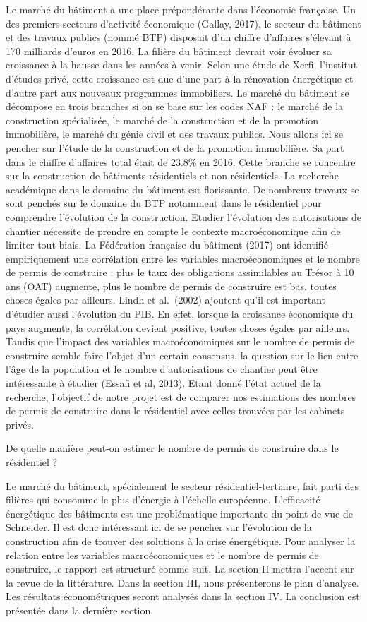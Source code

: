 \documentclass[11pt,]{article}
\begin{document}
Le marché du bâtiment a une place prépondérante dans l'économie
française. Un des premiers secteurs d'activité économique (Gallay,
2017), le secteur du bâtiment et des travaux publics (nommé BTP)
disposait d'un chiffre d'affaires s'élevant à 170 milliards d'euros en
2016. La filière du bâtiment devrait voir évoluer sa croissance à la
hausse dans les années à venir. Selon une étude de Xerfi, l'institut
d'études privé, cette croissance est due d'une part à la rénovation
énergétique et d'autre part aux nouveaux programmes immobiliers. Le
marché du bâtiment se décompose en trois branches si on se base sur les
codes NAF : le marché de la construction spécialisée, le marché de la
construction et de la promotion immobilière, le marché du génie civil et
des travaux publics. Nous allons ici se pencher sur l'étude de la
construction et de la promotion immobilière. Sa part dans le chiffre
d'affaires total était de 23.8\% en 2016. Cette branche se concentre sur
la construction de bâtiments résidentiels et non résidentiels. La
recherche académique dans le domaine du bâtiment est florissante. De
nombreux travaux se sont penchés sur le domaine du BTP notamment dans le
résidentiel pour comprendre l'évolution de la construction. Etudier
l'évolution des autorisations de chantier nécessite de prendre en compte
le contexte macroéconomique afin de limiter tout biais. La Fédération
française du bâtiment (2017) ont identifié empiriquement une corrélation
entre les variables macroéconomiques et le nombre de permis de
construire : plus le taux des obligations assimilables au Trésor à 10
ans (OAT) augmente, plus le nombre de permis de construire est bas,
toutes choses égales par ailleurs. Lindh et al.~(2002) ajoutent qu'il
est important d'étudier aussi l'évolution du PIB. En effet, lorsque la
croissance économique du pays augmente, la corrélation devient positive,
toutes choses égales par ailleurs. Tandis que l'impact des variables
macroéconomiques sur le nombre de permis de construire semble faire
l'objet d'un certain consensus, la question sur le lien entre l'âge de
la population et le nombre d'autorisations de chantier peut être
intéressante à étudier (Essafi et al, 2013). Etant donné l'état actuel
de la recherche, l'objectif de notre projet est de comparer nos
estimations des nombres de permis de construire dans le résidentiel avec
celles trouvées par les cabinets privés.

De quelle manière peut-on estimer le nombre de permis de construire dans
le résidentiel ?

Le marché du bâtiment, spécialement le secteur résidentiel-tertiaire,
fait parti des filières qui consomme le plus d'énergie à l'échelle
européenne. L'efficacité énergétique des bâtiments est une problématique
importante du point de vue de Schneider. Il est donc intéressant ici de
se pencher sur l'évolution de la construction afin de trouver des
solutions à la crise énergétique. Pour analyser la relation entre les
variables macroéconomiques et le nombre de permis de construire, le
rapport est structuré comme suit. La section II mettra l'accent sur la
revue de la littérature. Dans la section III, nous présenterons le plan
d'analyse. Les résultats économétriques seront analysés dans la section
IV. La conclusion est présentée dans la dernière section.
\end{document}

